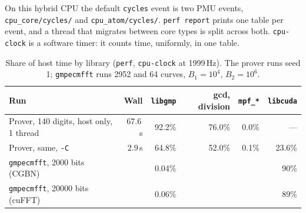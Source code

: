 \documentclass[11pt,a4paper]{article}
\newcommand{\code}[1]{\texttt{#1}}
\begin{document}
On this hybrid CPU the default \code{cycles} event is two PMU events,
\code{cpu\_core/cycles/} and \code{cpu\_atom/cycles/}. \code{perf report}
prints one table per event, and a thread that migrates between core types
is split across both. \code{cpu-clock} is a software timer: it counts
time, uniformly, in one table.

\begin{table}[ht]
\centering
\begin{tabular}{lrrrrr}
\toprule
Run & Wall & \code{libgmp} & gcd, division & \code{mpf\_*} & \code{libcuda} \\
\midrule
Prover, 140 digits, host only, 1 thread & 67.6\,s & 92.2\% & 76.0\% & 0.0\% & --- \\
Prover, same, \code{-C}                 & 2.9\,s  & 64.8\% & 52.0\% & 0.1\% & 23.6\% \\
\code{gmpecmfft}, 2000 bits (CGBN)      &         & 0.04\% &        &       & 90\% \\
\code{gmpecmfft}, 20000 bits (cuFFT)    &         & 0.06\% &        &       & 89\% \\
\bottomrule
\end{tabular}
\caption{Share of host time by library (\code{perf}, \code{cpu-clock} at
  1999\,Hz). The prover runs seed 1; \code{gmpecmfft} runs 2952 and 64
  curves, $B_1 = 10^4$, $B_2 = 10^6$.}
\label{tab:prof}
\end{table}
\end{document}
